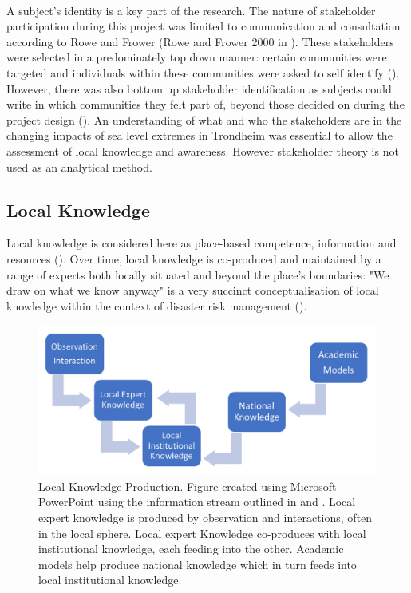 \paragraph{}
A subject's identity is a key part of the research. The nature of stakeholder participation during this project was limited to communication and consultation according to Rowe and Frower  (Rowe and Frower 2000 in \cite{reed_stakeholder_nodate}). These stakeholders were selected in a predominately top down manner:  certain communities were targeted and individuals within these communities were asked to self identify (\cite{reed_stakeholder_nodate}). However, there was also bottom up stakeholder identification as subjects could write in which communities they felt part of, beyond those decided on during the project design (\cite{reed_stakeholder_nodate}). An understanding of what and who the stakeholders are in the changing impacts of sea level extremes in Trondheim was essential to allow the assessment of local knowledge and awareness. However stakeholder theory is not used as an analytical method.

\subsection{Local Knowledge}

Local knowledge is considered here as place-based competence, information and resources (\cite{setten_we_2019}). Over time,  local knowledge is co-produced and maintained by a range of experts both locally situated and beyond the place's boundaries: "We draw on what we know anyway" is a very succinct conceptualisation of local knowledge within the context of disaster risk management (\cite{setten_we_2019}). 

\begin{figure}[h]
    \centering
    \includegraphics[width=1\textwidth]{fig_theory/local knowledge accumulation.png}
    \caption{Local Knowledge Production. Figure created using Microsoft PowerPoint using the information stream outlined in \cite{setten_we_2019} and \cite{rod_integrated_2012}. Local expert knowledge is produced by observation and interactions, often in the local sphere. Local expert Knowledge co-produces with local institutional knowledge, each feeding into the other. Academic models help produce national knowledge which in turn feeds into local institutional knowledge.}
    \label{fig:local_knowledge}
\end{figure}


